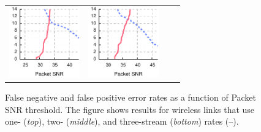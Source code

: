 \begin{figure}[p]
\begin{leftfullpage}
\begin{tabular}{cccc}
	\includegraphics[height=1.2in]{figures/delivery_figures/goodbad/packet_snr_goodbad_22.pdf} &
	\includegraphics[height=1.2in]{figures/delivery_figures/goodbad/packet_snr_goodbad_23.pdf}
	\end{tabular}

	\caption[Thresholds and False Negative/Positive Rates with Packet SNR]{\label{fig:packet_snr_goodbad}False negative and false positive error rates as a function of Packet SNR threshold. The figure shows results for wireless links that use one- (\emph{top}), two- (\emph{middle}), and three-stream (\emph{bottom}) rates (--).}
	\end{leftfullpage}
\end{figure}

